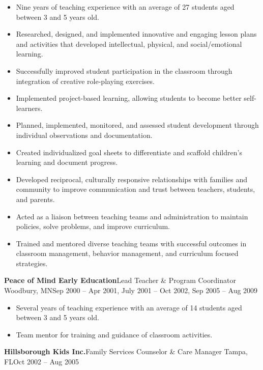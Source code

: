 \documentclass[letterpaper,10pt]{article}
\begin{document}
\begin{itemize}
    \item Nine years of teaching experience with an average of 27 students aged between 3 and 5 years old.
    \item Researched, designed, and implemented innovative and engaging lesson plans and activities that developed intellectual, physical, and social/emotional learning.
    \item Successfully improved student participation in the classroom through integration of creative role-playing exercises.
    \item Implemented project-based learning, allowing students to become better self-learners.
    \item Planned, implemented, monitored, and assessed student development through individual observations and documentation.
    \item Created individualized goal sheets to differentiate and scaffold children's learning and document progress.
    \item Developed reciprocal, culturally responsive relationships with families and community to improve communication
    and trust between teachers, students, and parents.
    \item Acted as a liaison between teaching teams and administration to maintain policies, solve problems, and improve curriculum.
    \item Trained and mentored diverse teaching teams with successful outcomes in classroom management, behavior management, and curriculum focused strategies.
\end{itemize}

\vspace{1pc}
\textbf{Peace of Mind Early Education}\hfill Lead Teacher \& Program Coordinator
\smallbreak Woodbury, MN\hfill Sep 2000 -- Apr 2001, July 2001 -- Oct 2002, Sep 2005 -- Aug 2009

\begin{itemize}
    \item Several years of teaching experience with an average of 14 students aged between 3 and 5 years old.
    \item Team mentor for training and guidance of classroom activities.
\end{itemize}

\vspace{1pc}
\textbf{Hillsborough Kids Inc.}\hfill Family Services Counselor \& Care Manager
\smallbreak Tampa, FL\hfill Oct 2002 -- Aug 2005
\end{document}
